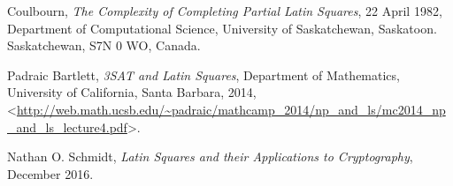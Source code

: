 \begin{thebibliography}    
    Coulbourn, \textit{The Complexity of Completing Partial Latin Squares}, 22 April 1982, Department of Computational Science, University of Saskatchewan, Saskatoon. Saskatchewan, S7N 0 WO, Canada.

    Padraic Bartlett, \textit{3SAT and Latin Squares}, Department of Mathematics, University of California, Santa Barbara, 2014, <\url{http://web.math.ucsb.edu/~padraic/mathcamp_2014/np_and_ls/mc2014_np_and_ls_lecture4.pdf}>.

    Nathan O. Schmidt, \textit{Latin Squares and their Applications to Cryptography}, December 2016.



 
\end{thebibliography}
